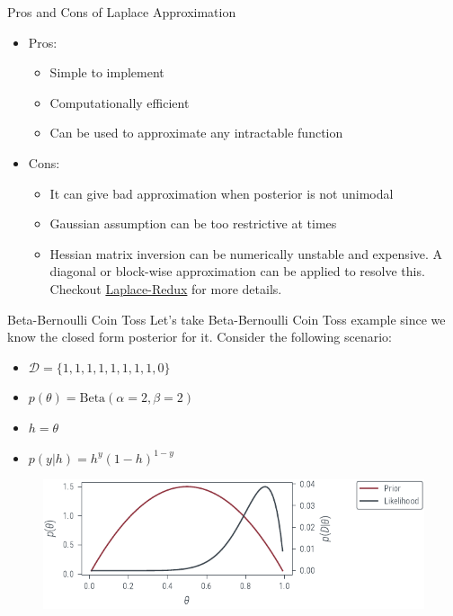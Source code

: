 \documentclass{beamer}
\begin{document}
\begin{frame}{Pros and Cons of Laplace Approximation}
    \begin{itemize}
        \item Pros:
              \begin{itemize}
                  \item Simple to implement
                  \item Computationally efficient
                  \item Can be used to approximate any intractable function
              \end{itemize}
              \pause
        \item Cons:
              \begin{itemize}
                  \item It can give bad approximation when posterior is not unimodal
                  \item Gaussian assumption can be too restrictive at times
                  \item Hessian matrix inversion can be numerically unstable and expensive. A diagonal or block-wise approximation can be applied to resolve this. Checkout \href{https://github.com/AlexImmer/Laplace}{Laplace-Redux} for more details.
              \end{itemize}
    \end{itemize}

\end{frame}

\begin{frame}{Beta-Bernoulli Coin Toss}
    Let's take Beta-Bernoulli Coin Toss example since we know the closed form posterior for it. Consider the following scenario:
    \pause
    \begin{itemize}
        \item $\mathcal{D} = \{1, 1, 1, 1, 1, 1, 1, 1, 0\}$
        \item $p(\theta) = \text{Beta}(\alpha=2, \beta=2)$
        \item $h = \theta$
        \item $p(y|h) = h^y(1-h)^{1-y}$
    \end{itemize}
    \pause
    \begin{figure}
        \includegraphics[]{../figures/laplace-approx/beta-prior-coin-toss.pdf}
    \end{figure}
\end{frame}
\end{document}
